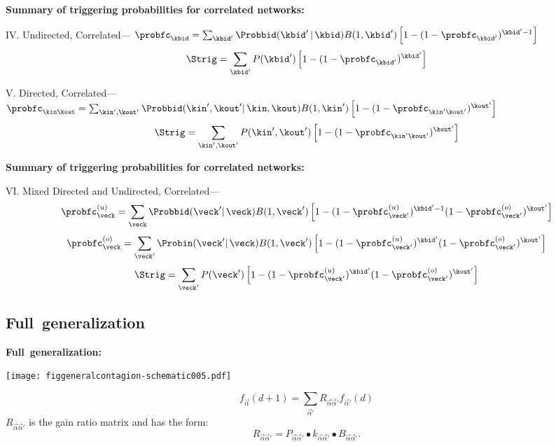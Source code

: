 \begin{frame}[plain]
  


  \small
  \textbf{Summary of triggering probabilities for correlated networks:}
    
    
    IV. Undirected, Correlated---
    $
    \probfc_{\kbid} = 
    \sum_{\kbid'}
    \Probbid(\kbid'\, | \, \kbid)
    B(1,\kbid')
    \left[
      1
      -
      (1-\probfc_{\kbid'})^{\kbid'-1}
    \right]
    $
    $$
    \Strig
    =
    \sum_{\kbid'} 
    P(\kbid')
    \left[
      1 - (1-\probfc_{\kbid'})^{\kbid'}
    \right]
    $$
    
    V. Directed, Correlated---
    $
    \probfc_{\kin\kout} = 
    \sum_{\kin',\kout'}
    \Probbid(\kin',\kout' | \, \kin,\kout)
    B(1,\kin')
    \left[
      1
      -
      (1-\probfc_{\kin'\kout'})^{\kout'}
    \right]
    $
    $$
    \Strig
    =
    \sum_{\kin',\kout'} 
    P(\kin',\kout')
    \left[
      1 - (1-\probfc_{\kin'\kout'})^{\kout'}
    \right]
    $$
    
  


  \small
  \textbf{Summary of triggering probabilities for correlated networks:}
    
    
      VI. Mixed Directed and Undirected, Correlated---
      $$
      \probfc^{(u)}_{\veck} 
      = 
      \sum_{\veck}
      \Probbid(\veck' | \, \veck)
      B(1,\veck')
      \left[
        1
        -
        (1-\probfc^{(u)}_{\veck'})^{\kbid'-1}
        (1-\probfc^{(o)}_{\veck'})^{\kout'}
      \right]
      $$
      $$
      \probfc^{(o)}_{\veck} 
      = 
      \sum_{\veck'}
      \Probin(\veck' | \, \veck)
      B(1,\veck')
      \left[
        1
        -
        (1-\probfc^{(u)}_{\veck'})^{\kbid'}
        (1-\probfc^{(o)}_{\veck'})^{\kout'}
      \right]
      $$
      $$
      \Strig
      =
      \sum_{\veck'} 
      P(\veck')
      \left[
        1 - (1-\probfc^{(u)}_{\veck'})^{\kbid'}
        (1-\probfc^{(o)}_{\veck'})^{\kout'}
      \right]
      $$
    
  

\subsection{Full\ generalization}

  \textbf{Full\ generalization:}

      
    \texttt{[image: figgeneralcontagion-schematic005.pdf]}
    
    $$
    f_{\vec{\alpha}}(d+1) 
    = 
    \sum_{\vec{\alpha}'}
    R_{\vec{\alpha} \vec{\alpha}'}
    f_{\vec{\alpha}'}(d)
    $$
    $
    R_{\vec{\alpha} \vec{\alpha}'}
    $
    is the gain ratio matrix
    and has the form:
    $$
    R_{\vec{\alpha} \vec{\alpha}'}
    =
    P_{\vec{\alpha} \vec{\alpha}'}
    \bullet
    k_{\vec{\alpha} \vec{\alpha}'}
    \bullet
    B_{\vec{\alpha} \vec{\alpha}'}.
    $$
  

\end{frame}
